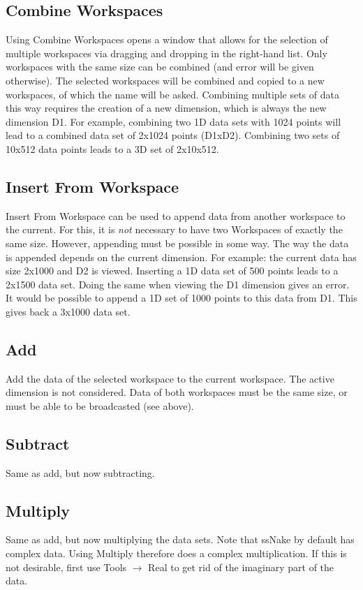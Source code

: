 \documentclass[11pt,a4paper]{article}
\begin{document}
\subsection{Combine Workspaces}
Using Combine Workspaces opens a window that allows for the selection of multiple workspaces via dragging and dropping in the right-hand list.
Only workspaces with the same size can be combined (and error will be given otherwise). The selected workspaces will be combined and copied to a new workspaces, of which the name will be asked.
Combining multiple sets of data this way requires the creation of a new dimension, which is always the new dimension D1. For example, combining two 1D data sets with 1024 points will
lead to a combined data set of 2x1024 points (D1xD2). Combining two sets of 10x512 data points leads to a 3D set of 2x10x512.


\subsection{Insert From Workspace}
Insert From Workspace can be used to append data from another workspace to the current. For this, it is \textit{not} necessary to have two Workspaces of exactly the same size.
However, appending must be possible in some way. The way the data is appended depends on the current dimension. For example: the current data has size 2x1000 and D2 is viewed. 
Inserting a 1D data set of 500 points leads to a 2x1500 data set. Doing the same when viewing the D1 dimension gives an error. It would be possible to append a 1D set of 1000
points to this data from D1. This gives back a 3x1000 data set.


\subsection{Add}
Add the data of the selected workspace to the current workspace. The active dimension is not considered. Data of both workspaces must be the same size, or must be able to be broadcasted (see above).


\subsection{Subtract}
Same as add, but now subtracting.

\subsection{Multiply}
Same as add, but now multiplying the data sets. Note that ssNake by default has complex data. Using Multiply therefore does a complex multiplication.
If this is not desirable, first use Tools $\rightarrow$ Real to get rid of the imaginary part of the data.
\end{document}
